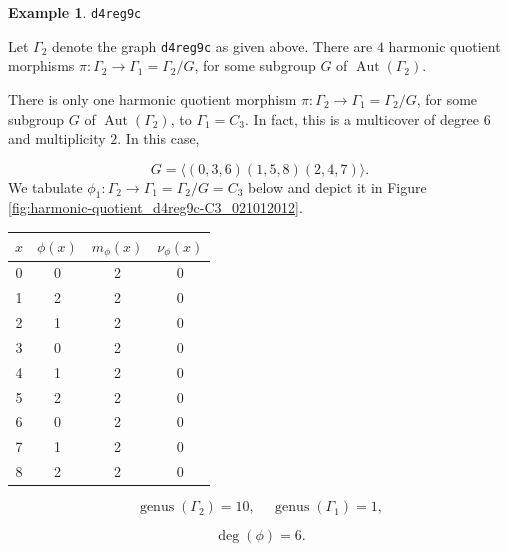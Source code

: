 \documentclass[12pt,letterpaper]{article}
\theoremstyle{definition}
\newtheorem{example}[theorem]{Example}
\DeclareMathOperator{\Aut}{Aut}
\DeclareMathOperator{\genus}{genus}
\begin{document}
\begin{example}%
\label{example:d4reg9c}
 {\tt d4reg9c}\newline
{\rm  
Let $\Gamma_2$ denote the graph {\tt d4reg9c} as given above.
There are $4$ harmonic quotient morphisms
$\pi: \Gamma_2\to \Gamma_1=\Gamma_2/G$,
for some subgroup $G$ of $\Aut(\Gamma_2)$.

There is only one harmonic quotient morphism
$\pi: \Gamma_2\to \Gamma_1=\Gamma_2/G$,
for some subgroup $G$ of $\Aut(\Gamma_2)$, to
$\Gamma_1=C_3$. In fact, this is a multicover
of degree $6$ and multiplicity $2$.
In this case,

\[
G = \langle (0,3,6)(1,5,8)(2,4,7) \rangle.
\]
We tabulate $\phi_1: \Gamma_2\to \Gamma_1=\Gamma_2/G=C_3$
below and depict it in Figure \ref{fig:harmonic-quotient_d4reg9c-C3_021012012}.

\begin{center}
\begin{tabular}{c|c|c|c}  
  $x$ & $\phi(x)$ & $m_\phi(x)$ & $\nu_\phi(x)$ \\ \hline
  0   &    0   &        2         &  0   \\ 
  1   &    2   &        2         &  0  \\ 
  2   &    1   &        2         &  0  \\ 
  3   &    0   &        2         &  0  \\ 
  4   &    1   &        2         &  0   \\
  5   &    2   &        2         &  0   \\
  6   &    0   &        2         &  0   \\
  7   &    1   &        2         &  0   \\
  8   &    2   &        2         &  0   \\ 
\end{tabular}
\end{center}

\[
  \genus(\Gamma_2) =10,\ \ \ \ \
  \genus(\Gamma_1) =1,
\]

\[
\deg(\phi) =6.
\]

}
\end{example}
\end{document}
